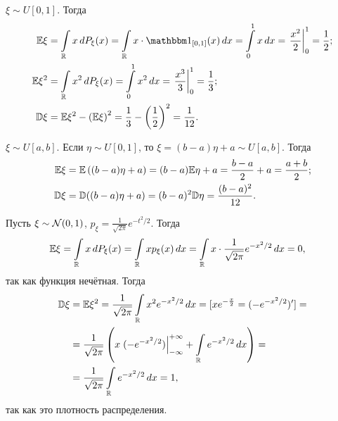 \documentclass[../main.tex]{subfiles}
\begin{document}
\begin{exmpl}
 $ \xi \sim U[0,1] $. Тогда
 \begin{align*}
  \E\xi &= \int\limits_{\R} x\,dP_\xi(x)  = \int\limits_{\R} x \cdot \Ind_{[0,1]}  (x)\,dx= \int\limits_{0}^{1} x\,dx = \left. \frac{x^{2}}{2} \right|_0^{1} = \frac{1}{2}; \\
   \E\xi^{2} &= \int\limits_{\R} x^2\,dP_\xi(x) = \int\limits_{0}^{1} x^{2}\,dx = \left. \frac{x^{3}}{3}\right|_0^{1} = \frac{1}{3}; \\
    \D\xi &=\E\xi^{2} - \left( \E\xi \right)^{2} = \frac{1}{3} - \left(\frac{1}{2}\right)^2 = \frac{1}{12}.
   \end{align*} 
  \end{exmpl}
  \begin{exmpl}
   $ \xi \sim U[a,b] $. Если $ \eta \sim U[0,1] $, то $ \xi = (b-a)\eta + a\sim U[a,b] $. Тогда
   \begin{align*}
    \mathbb E\xi &= \mathbb E \left( (b-a)\eta + a \right) = (b-a)\mathbb E\eta + a = \frac{b-a}{2} + a = \frac{a+b}{2}; \\
    \mathbb D\xi &= \mathbb D((b-a)\eta + a) = (b-a)^{2}\mathbb D\eta = \frac{(b-a)^{2}}{12}.
   \end{align*} 
  \end{exmpl}

  \begin{exmpl}
   Пусть $ \xi \sim \mathcal N(0,1) $,  $ p_\xi = \frac{1}{\sqrt{2\pi}}e^{-t^{2} / 2} $. Тогда
   \begin{align*}
    \mathbb E\xi &= \int\limits_{\mathbb{R}} x\,dP_\xi(x) = \int\limits_{\mathbb{R}} x p_\xi(x)\,dx = \int\limits_{\mathbb{R}} x \cdot \frac{1}{\sqrt{2\pi}}      e^{-x^{2} / 2}\,dx = 0,
   \end{align*} так как функция нечётная. Тогда
   \begin{align*}
    \mathbb D\xi &= \mathbb E\xi^{2} = \frac{1}{\sqrt{2\pi}}\int\limits_{\mathbb{R}} x^{2} e^{-x^{2} / 2}\,dx = [xe^{-\frac{x}{2}} = (-e^{-x^{2} / 2})'] = \\
    &= \frac{1}{\sqrt{2\pi}} \left( x \left.(-e^{-x^{2} / 2})\right|_{-\infty}^{+\infty} + \int\limits_{\mathbb{R}} e^{-x^{2} / 2}\,dx  \right) = \\
     &= \frac{1}{\sqrt{2\pi}} \int\limits_{\mathbb{R}} e^{-x^{2} / 2} \,dx = 1,
    \end{align*} так как это плотность распределения.
   \end{exmpl}
\end{document}
